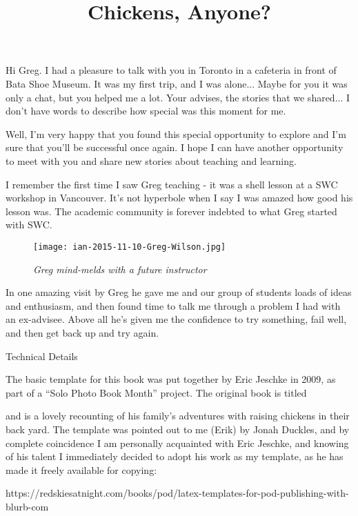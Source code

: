 Hi Greg. I had a pleasure to talk with you in Toronto in a cafeteria in front
of Bata Shoe Museum. It was my first trip, and I was alone... Maybe for you it
was only a chat, but you helped me a lot. Your advises, the stories that we
shared... I don't have words to describe how special was this moment for me. 

Well, I'm very happy that you found this special opportunity to explore and I'm
sure that you'll be successful once again. I hope I can have another
opportunity to meet with you and share new stories about teaching and learning.



I remember the first time I saw Greg teaching - it was a shell lesson at a SWC
workshop in Vancouver. It's not hyperbole when I say I was amazed how good his
lesson was. The academic community is forever indebted to what Greg started
with SWC. 


\newpage

\begin{figure}[h!]
\centering
\texttt{[image: ian-2015-11-10-Greg-Wilson.jpg]}
\caption*{\textit{Greg mind-melds with a future instructor}}
\end{figure}
\vspace{-0.25cm}

In one amazing visit by Greg he gave me and our group of students loads of
ideas and enthusiasm, and then found time to talk me through a problem I had
with an ex-advisee. Above all he's given me the confidence to try something,
fail well, and then get back up and try again.


\newpage

{\LARGE Technical Details}

The basic template for this book was put together by Eric Jeschke in
2009, as part of a ``Solo Photo Book Month'' project.  The original book
is titled \title{Chickens, Anyone?} and is a lovely recounting of his
family's adventures with raising chickens in their back yard.  The template
was pointed out to me (Erik) by Jonah Duckles, and by complete coincidence
I am personally acquainted with Eric Jeschke, and knowing of his talent I
immediately decided to adopt his work as my template, as he has made it
freely available for copying:

https://redskiesatnight.com/books/pod/latex-templates-for-pod-publishing-with-blurb-com

